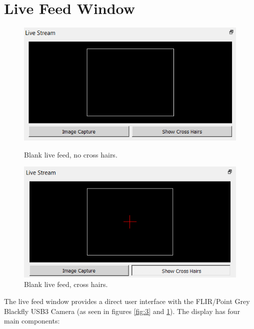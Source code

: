 \documentclass[a4paper, 12pt]{report}
\begin{document}
    \section{Live Feed Window}
    \begin{figure}[!tbph]
      \centering
      \begin{minipage}[b]{0.49\textwidth}
        \includegraphics[width=\textwidth]{figures/camera_no_cross_hairs.png}
        \caption{Blank live feed, no cross hairs.}
        \label{fig:3}
      \end{minipage}
      \hfill
      \begin{minipage}[b]{0.49\textwidth}
        \includegraphics[width=\textwidth]{figures/camera_cross_hairs.png}
        \caption{Blank live feed, cross hairs.}
        \label{fig:4}
      \end{minipage}
    \end{figure}

    The live feed window provides a direct user interface with the FLIR/Point Grey Blackfly USB3 Camera (as seen in figures \ref{fig:3} and \ref{fig:4}). The display has four main components:
    
\end{document}
